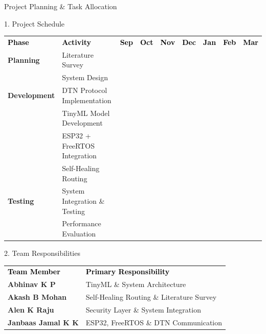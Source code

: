 \documentclass[11pt,aspectratio=43]{beamer}
\begin{document}
\begin{frame}[t]{Project Planning \& Task Allocation}

\small
\setlength{\tabcolsep}{5pt}
\renewcommand{\arraystretch}{1.25}

\begin{block}{1. Project Schedule}
\scriptsize
\begin{tabular*}{\linewidth}{@{\extracolsep{\fill}}llccccccc}

\textcolor{black}{\textbf{Phase}} &
\textcolor{black}{\textbf{Activity}} &
\textcolor{black}{\textbf{Sep}} &
\textcolor{black}{\textbf{Oct}} &
\textcolor{black}{\textbf{Nov}} &
\textcolor{black}{\textbf{Dec}} &
\textcolor{black}{\textbf{Jan}} &
\textcolor{black}{\textbf{Feb}} &
\textcolor{black}{\textbf{Mar}} \\

\textbf{Planning} & Literature Survey
    & \cellcolor{-} & & & & & & \\
& System Design
    & \cellcolor{-} & \cellcolor{-} & & & & & \\ \hline

\textbf{Development} & DTN Protocol Implementation
    & & \cellcolor{-} & \cellcolor{-} & & & & \\
& TinyML Model Development
    & & & \cellcolor{-} & \cellcolor{-} & & & \\
& ESP32 + FreeRTOS Integration
    & & & & \cellcolor{-} & \cellcolor{-} & & \\
& Self-Healing Routing
    & & & & & \cellcolor{-} & \cellcolor{-} & \\ \hline

\textbf{Testing} & System Integration \& Testing
    & & & & & & \cellcolor{-} & \cellcolor{-} \\
& Performance Evaluation
    & & & & & & \cellcolor{-} & \cellcolor{-} \\

\end{tabular*}
\end{block}

\begin{block}{2. Team Responsibilities}
\scriptsize
\begin{tabular*}{\linewidth}{@{\extracolsep{\fill}}ll}

\textcolor{black}{\textbf{Team Member}} &
\textcolor{black}{\textbf{Primary Responsibility}} \\


\textbf{Abhinav K P} & TinyML \& System Architecture \\
\textbf{Akash B Mohan} & Self-Healing Routing \& Literature Survey \\
\textbf{Alen K Raju} & Security Layer \& System Integration \\
\textbf{Janbaas Jamal K K} & ESP32, FreeRTOS \& DTN Communication \\
\end{tabular*}
\end{block}

\end{frame}
\end{document}
